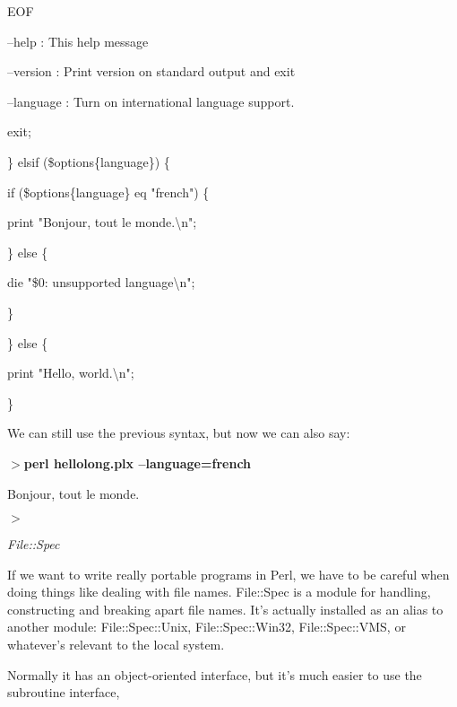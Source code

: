 \documentclass[a4paper,11pt]{book}
\begin{document}
\noindent 

\noindent 

\noindent 

\noindent 

\noindent EOF

\noindent 

\noindent --help : This help message

\noindent --version  : Print version on standard output and exit

\noindent --language : Turn on international language support.

\noindent 

\noindent exit;

\noindent \} elsif (\$options\{language\}) \{

\noindent if (\$options\{language\} eq "french") \{

\noindent print "Bonjour, tout le monde.\textbackslash n";

\noindent \} else \{

\noindent die "\$0: unsupported language\textbackslash n";

\noindent \}

\noindent \} else \{

\noindent print "Hello, world.\textbackslash n";

\noindent \}

\noindent 

\noindent 

\noindent We can still use the previous syntax, but now we can also say:

\noindent 

\noindent $>$\textbf{perl hellolong.plx --language=french}

\noindent Bonjour, tout le monde.

\noindent $>$

\noindent 

\noindent \textit{File::Spec}

\noindent If we want to write really portable programs in Perl, we have to be careful when doing things like dealing with file names. File::Spec is a module for handling, constructing and breaking apart file names. It's actually installed as an alias to another module: File::Spec::Unix, File::Spec::Win32, File::Spec::VMS, or whatever's relevant to the local system.

\noindent 

\noindent Normally it has an object-oriented interface, but it's much easier to use the subroutine interface,
\end{document}
